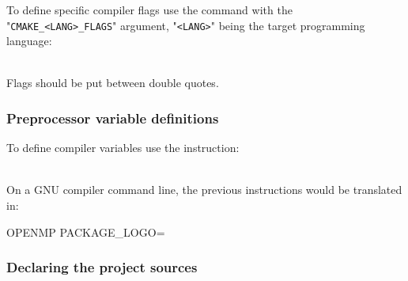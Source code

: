 To define specific compiler flags use the  command with the "\texttt{CMAKE\_<LANG>\_FLAGS}" 
argument, "\texttt{<LANG>}" being the target programming language:
\begin{script}
\end{script}
\\[-0.25cm]
\noindent Flags should be put between double quotes. 

\subsubsection*{Preprocessor variable definitions}

To define compiler variables use the  instruction:
\begin{script}
\end{script}
\\[-0.25cm]
\noindent On a GNU compiler command line, the previous instructions would be translated in:
\begin{script}
\fprompt{~}  OPENMP PACKAGE_LOGO=
\end{script}

\subsubsection*{Declaring the project sources}

